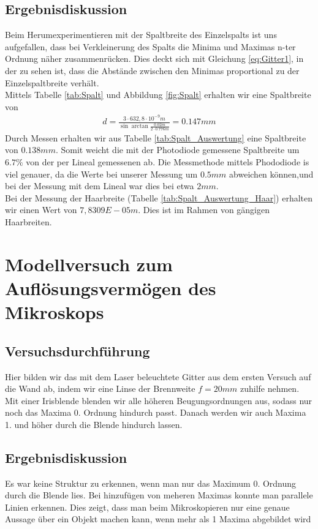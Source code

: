 \documentclass{scrartcl}
\begin{document}
\subsection{Ergebnisdiskussion}
Beim Herumexperimentieren mit der Spaltbreite des Einzelspalts ist uns aufgefallen, dass bei Verkleinerung des Spalts die Minima und Maximas n-ter Ordnung näher zusammenrücken. Dies deckt sich mit Gleichung \ref{eq:Gitter1}, in der zu sehen ist, dass die Abstände zwischen den Minimas proportional zu der Einzelspaltbreite verhält.\\
Mittels Tabelle \ref{tab:Spalt} und Abbildung \ref{fig:Spalt} erhalten wir eine Spaltbreite von
\begin{align*}
d = \frac{3 \cdot 632,8 \cdot 10^{-9}m}{\sin{\arctan{\frac{0.02m}{2 \cdot 0.776m}}}} = 0.147mm
\end{align*}
Durch Messen erhalten wir aus Tabelle \ref{tab:Spalt_Auswertung} eine Spaltbreite von $0.138mm$. Somit weicht die mit der Photodiode gemessene Spaltbreite um $6.7\%$ von der per Lineal gemessenen ab. Die Messmethode mittels Phododiode is viel genauer, da die Werte bei unserer Messung um  $0.5 mm$ abweichen können,und bei der Messung mit dem Lineal war dies bei etwa $2mm$.\\
Bei der Messung der Haarbreite (Tabelle \ref{tab:Spalt_Auswertung_Haar}) erhalten wir einen Wert von $7,8309E-05 m$. Dies ist im Rahmen von gängigen Haarbreiten.
\section{Modellversuch zum Auflösungsvermögen des Mikroskops}
\subsection{Versuchsdurchführung}
Hier bilden wir das mit dem Laser beleuchtete Gitter aus dem ersten Versuch auf die Wand ab, indem wir eine Linse der Brennweite $f=20mm$ zuhilfe nehmen. Mit einer Irisblende blenden wir alle höheren Beugungsordnungen aus, sodass nur noch das Maxima 0. Ordnung hindurch passt. Danach werden wir auch Maxima 1. und höher durch die Blende hindurch lassen.
\subsection{Ergebnisdiskussion}
Es war keine Struktur zu erkennen, wenn man nur das Maximum 0. Ordnung durch die Blende lies. Bei hinzufügen von meheren Maximas konnte man parallele Linien erkennen. Dies zeigt, dass man beim Mikroskopieren nur eine genaue Aussage über ein Objekt machen kann, wenn mehr als 1 Maxima abgebildet wird 
\end{document}
